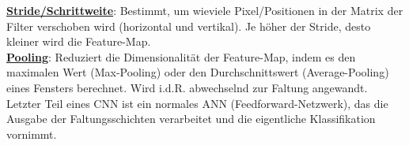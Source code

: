 \underline{\textbf{Stride/Schrittweite}}: Bestimmt, um wieviele Pixel/Positionen in der Matrix der Filter verschoben wird (horizontal und vertikal). Je höher der Stride, desto kleiner wird die Feature-Map.\\

\underline{\textbf{Pooling}}: Reduziert die Dimensionalität der Feature-Map, indem es den maximalen Wert (Max-Pooling) oder den Durchschnittswert (Average-Pooling) eines Fensters berechnet. Wird i.d.R. abwechselnd zur Faltung angewandt.\\

Letzter Teil eines CNN ist ein normales ANN (Feedforward-Netzwerk), das die Ausgabe der Faltungsschichten verarbeitet und die eigentliche Klassifikation vornimmt.\\